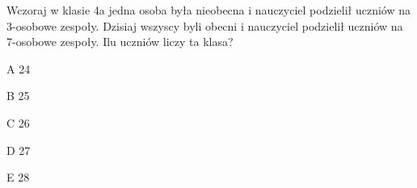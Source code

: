 \begin{tresc}
Wczoraj w klasie 4a jedna osoba była nieobecna i nauczyciel podzielił uczniów na 3-osobowe zespoły. Dzisiaj wszyscy byli obecni i nauczyciel podzielił uczniów na 7-osobowe zespoły. Ilu uczniów liczy ta klasa?
\end{tresc}
\begin{wariant}{A} 24 \end{wariant}
\begin{wariant}{B} 25 \end{wariant}
\begin{wariant}{C} 26 \end{wariant}
\begin{wariant}{D} 27 \end{wariant}
\begin{wariant}{E} 28 \end{wariant}
